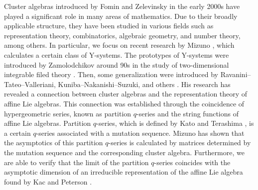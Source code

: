 \documentclass[pdftex]{sigma}
\numberwithin{equation}{section}
\begin{document}
Cluster algebras introduced by Fomin and Zelevinsky in the early 2000s \cite{FZ,FZ2} have played a significant role in many areas of mathematics.
Due to their broadly applicable structure, they have been studied in various fields such as representation theory, combinatorics, algebraic geometry, and number theory, among others.
In particular, we focus on recent research by Mizuno \cite{M}, which calculates a certain class of Y-systems.
The prototypes of Y-systems were introduced by Zamolodchikov around 90s in the study of two-dimensional integrable filed theory \cite{Z}.
Then, some generalization were introduced by Ravanini--Tateo--Valleriani, Kuniba--Nakanishi--Suzuki, and others \cite{KNS0, RTV}.
His research has revealed a connection between cluster algebras and the representation theory of affine Lie algebras.
This connection was established through the coincidence of hypergeometric series, known as partition $q$-series and the string functions of affine Lie algebras.
Partition $q$-series, which is defined by Kato and Terashima \cite{KT}, is a certain $q$-series associated with a mutation sequence.
Mizuno has shown that the asymptotics of this partition $q$-series is calculated by matrices determined by the mutation sequence and the corresponding cluster algebra.
Furthermore, we are able to verify that the limit of the partition $q$-series coincides with the asymptotic dimension of an irreducible representation of the affine Lie algebra found by Kac and Peterson \cite{KP}.
\end{document}
